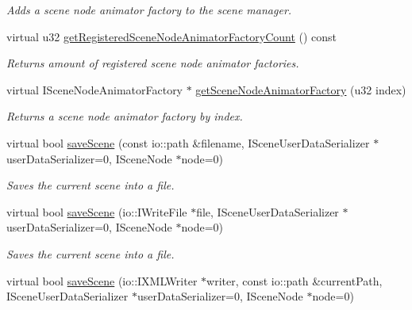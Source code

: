 \begin{DoxyCompactItemize}
\begin{DoxyCompactList}\small\item\em Adds a scene node animator factory to the scene manager. \end{DoxyCompactList}\item 
\hypertarget{classirr_1_1scene_1_1_c_scene_manager_ad28a405f5944b96c19b5ca8c61fbdf15}{virtual u32 \hyperlink{classirr_1_1scene_1_1_c_scene_manager_ad28a405f5944b96c19b5ca8c61fbdf15}{get\-Registered\-Scene\-Node\-Animator\-Factory\-Count} () const }\label{classirr_1_1scene_1_1_c_scene_manager_ad28a405f5944b96c19b5ca8c61fbdf15}

\begin{DoxyCompactList}\small\item\em Returns amount of registered scene node animator factories. \end{DoxyCompactList}\item 
\hypertarget{classirr_1_1scene_1_1_c_scene_manager_a82d20367310b5182750a2035d13ce03e}{virtual I\-Scene\-Node\-Animator\-Factory $\ast$ \hyperlink{classirr_1_1scene_1_1_c_scene_manager_a82d20367310b5182750a2035d13ce03e}{get\-Scene\-Node\-Animator\-Factory} (u32 index)}\label{classirr_1_1scene_1_1_c_scene_manager_a82d20367310b5182750a2035d13ce03e}

\begin{DoxyCompactList}\small\item\em Returns a scene node animator factory by index. \end{DoxyCompactList}\item 
virtual bool \hyperlink{classirr_1_1scene_1_1_c_scene_manager_a17da0640769c7dca94535d8d4a39d5e3}{save\-Scene} (const io\-::path \&filename, I\-Scene\-User\-Data\-Serializer $\ast$user\-Data\-Serializer=0, I\-Scene\-Node $\ast$node=0)
\begin{DoxyCompactList}\small\item\em Saves the current scene into a file. \end{DoxyCompactList}\item 
\hypertarget{classirr_1_1scene_1_1_c_scene_manager_a8e8156c6f906a470775ae0c57f48fc29}{virtual bool \hyperlink{classirr_1_1scene_1_1_c_scene_manager_a8e8156c6f906a470775ae0c57f48fc29}{save\-Scene} (io\-::\-I\-Write\-File $\ast$file, I\-Scene\-User\-Data\-Serializer $\ast$user\-Data\-Serializer=0, I\-Scene\-Node $\ast$node=0)}\label{classirr_1_1scene_1_1_c_scene_manager_a8e8156c6f906a470775ae0c57f48fc29}

\begin{DoxyCompactList}\small\item\em Saves the current scene into a file. \end{DoxyCompactList}\item 
\hypertarget{classirr_1_1scene_1_1_c_scene_manager_ab8c20589110a6cadf43ee99083c69833}{virtual bool \hyperlink{classirr_1_1scene_1_1_c_scene_manager_ab8c20589110a6cadf43ee99083c69833}{save\-Scene} (io\-::\-I\-X\-M\-L\-Writer $\ast$writer, const io\-::path \&current\-Path, I\-Scene\-User\-Data\-Serializer $\ast$user\-Data\-Serializer=0, I\-Scene\-Node $\ast$node=0)}\label{classirr_1_1scene_1_1_c_scene_manager_ab8c20589110a6cadf43ee99083c69833}


\end{DoxyCompactItemize}
